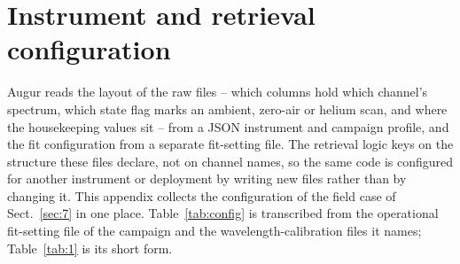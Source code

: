 \section{Instrument and retrieval configuration}
\label{app:A}

Augur reads the layout of the raw files -- which columns hold which channel's spectrum, which state flag marks an
ambient, zero-air or helium scan, and where the housekeeping values sit -- from a JSON instrument and campaign
profile, and the fit configuration from a separate fit-setting file. The retrieval logic keys on the structure these
files declare, not on channel names, so the same code is configured for another instrument or deployment by writing
new files rather than by changing it. This appendix collects the configuration of the field case of
Sect.~\ref{sec:7} in one place. Table~\ref{tab:config} is transcribed from the operational fit-setting file of the
campaign and the wavelength-calibration files it names; Table~\ref{tab:1} is its short form.

